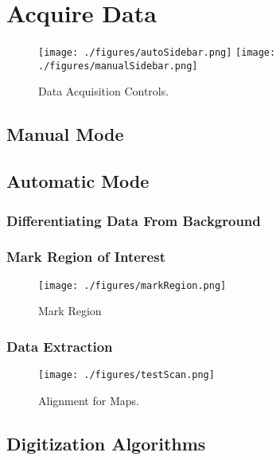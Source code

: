 \documentclass[letterpaper, 10pt]{article}
\begin{document}
\section{Acquire Data}

\begin{figure}
\begin{center}
\texttt{[image: ./figures/autoSidebar.png]}
\texttt{[image: ./figures/manualSidebar.png]}
\caption{Data Acquisition Controls.}
\label{fig:acquireData}
\end{center}
\end{figure}

\subsection{Manual Mode}
\subsection{Automatic Mode}
\subsubsection{Differentiating Data From Background}
\subsubsection{Mark Region of Interest}

\begin{figure}
\begin{center}
\texttt{[image: ./figures/markRegion.png]}
\caption{Mark Region}
\label{fig:markRegion}
\end{center}
\end{figure}

\subsubsection{Data Extraction}
\begin{figure}
\begin{center}
\texttt{[image: ./figures/testScan.png]}
\caption{Alignment for Maps.}
\label{fig:testScan}
\end{center}
\end{figure}
\subsection{Digitization Algorithms}
\end{document}
